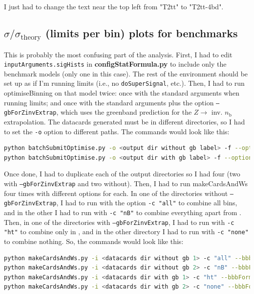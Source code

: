 I just had to change the text near the top left from "T2tt" to "T2tt-4bd".


\subsection{\texorpdfstring{$\sigma / \sigma_{\mathrm{theory}}$}{Sigma/sigma\_theory} (limits per bin) plots for benchmarks}

This is probably the most confusing part of the analysis. First, I had to edit \texttt{inputArguments.sigHists} in \textbf{configStatFormula.py} to include only the benchmark models (only one in this case). The rest of the environment should be set up as if I'm running limits (i.e., no \texttt{doSuperSignal}, etc.). Then, I had to run optimiseBinning on that model twice: once with the standard arguments when running limits; and once with the standard arguments plus the option \texttt{--gbForZinvExtrap}, which uses the greenband prediction for the $Z \rightarrow$ inv. $n_{\mathrm{b}}$ extrapolation. The datacards generated must be in different directories, so I had to set the \texttt{-o} option to different paths. The commands would look like this:

\begin{lstlisting}[belowskip=-0.7cm, language=sh, numbers=none]
python batchSubmitOptimise.py -o <output dir without gb label> -f --options "--shapeSystFromFile --getDataLumi --runFormula --extrapolateZinv --greenBand" --submit
python batchSubmitOptimise.py -o <output dir with gb label> -f --options "--shapeSystFromFile --getDataLumi --runFormula --extrapolateZinv --greenBand --gbForZinvExtrap" --submit
\end{lstlisting}

Once done, I had to duplicate each of the output directories so I had four (two with \texttt{--gbForZinvExtrap} and two without). Then, I had to run makeCardsAndWs four times with different options for each. In one of the directories without \texttt{--gbForZinvExtrap}, I had to run with the option \texttt{-c "all"} to combine all bins, and in the other I had to run with \texttt{-c "nB"} to combine everything apart from \njet. Then, in one of the directories with \texttt{--gbForZinvExtrap}, I had to run with \texttt{-c "ht"} to combine only in \HT, and in the other directory I had to run with \texttt{-c "none"} to combine nothing. So, the commands would look like this:

\begin{lstlisting}[belowskip=-0.7cm, language=sh, numbers=none]
python makeCardsAndWs.py -i <datacards dir without gb 1> -c "all" --bbbFormulaUssr --bbbOptSig
python makeCardsAndWs.py -i <datacards dir without gb 2> -c "nB" --bbbFormulaUssr --bbbOptSig
python makeCardsAndWs.py -i <datacards dir with gb 1> -c "ht" --bbbFormulaUssr --bbbOptSig
python makeCardsAndWs.py -i <datacards dir with gb 2> -c "none" --bbbFormulaUssr --bbbOptSig
\end{lstlisting}


